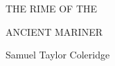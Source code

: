 \documentclass[12pt]{article}
\begin{document}
\thispagestyle{empty}

\vspace*{3in}

\begin{center}
{\fontsize{18}{22}\selectfont THE RIME OF THE}

\vspace{0.2in}

{\fontsize{18}{22}\selectfont ANCIENT MARINER}

\vspace{1.5in}

{\fontsize{11}{14}\selectfont Samuel Taylor Coleridge}
\end{center}

\clearpage

\vspace*{1in}
\end{document}
